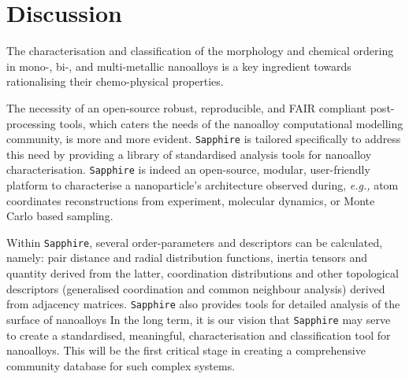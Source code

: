 \section{Discussion}
The characterisation and classification of the morphology and chemical ordering in mono-, bi-, and multi-metallic nanoalloys is a key ingredient towards rationalising their chemo-physical properties.
%

The necessity of an open-source robust, reproducible, and FAIR compliant post-processing tools, which caters the needs of the nanoalloy computational modelling community, is more and more evident.
\texttt{Sapphire} is tailored specifically to address this need by providing a library of standardised analysis tools for nanoalloy characterisation.
\texttt{Sapphire} is indeed an open-source, modular, user-friendly platform to characterise a nanoparticle's  architecture observed during, \textit{e.g.,} atom coordinates reconstructions from experiment,
molecular dynamics, or Monte Carlo based sampling.

Within \texttt{Sapphire}, several order-parameters and descriptors can be calculated, namely: pair distance and radial distribution functions, 
inertia tensors and quantity derived from the latter, coordination distributions and other topological descriptors (generalised coordination and common neighbour analysis) derived from adjacency matrices. 
\texttt{Sapphire} also provides tools for detailed analysis of the surface of nanoalloys
%
In the long term, it is our vision that \texttt{Sapphire} may serve to create a standardised, meaningful, characterisation and classification tool for nanoalloys. 
This will be the first critical stage in creating a comprehensive community database for such complex systems.
